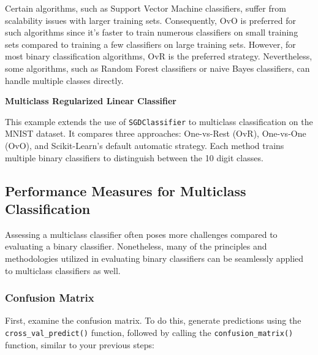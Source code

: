 \documentclass[12pt,letter]{article}
\begin{document}
Certain algorithms, such as Support Vector Machine classifiers, suffer from scalability issues with larger training sets. Consequently, OvO is preferred for such algorithms since it's faster to train numerous classifiers on small training sets compared to training a few classifiers on large training sets. However, for most binary classification algorithms, OvR is the preferred strategy. Nevertheless, some algorithms, such as Random Forest classifiers or naive Bayes classifiers, can handle multiple classes directly.

\begin{example}
\textbf{Multiclass Regularized Linear Classifier}

\noindent This example extends the use of \texttt{SGDClassifier} to multiclass classification on the MNIST dataset. It compares three approaches: One-vs-Rest (OvR), One-vs-One (OvO), and Scikit-Learn's default automatic strategy. Each method trains multiple binary classifiers to distinguish between the 10 digit classes.
\end{example}



\subsection{Performance Measures for Multiclass Classification}


Assessing a multiclass classifier often poses more challenges compared to evaluating a binary classifier. Nonetheless, many of the principles and methodologies utilized in evaluating binary classifiers can be seamlessly applied to multiclass classifiers as well.


\subsubsection{Confusion Matrix}




First, examine the confusion matrix. To do this, generate predictions using the \texttt{cross\_val\_\allowbreak predict()} function, followed by calling the \texttt{confusion\_matrix()} function, similar to your previous steps:
\end{document}
